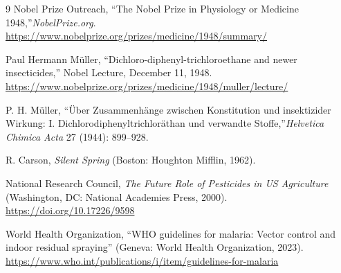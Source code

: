 \begin{thebibliography}{9}
Nobel Prize Outreach, ``The Nobel Prize in Physiology or Medicine 1948,''\emph{NobelPrize.org}.\\
\url{https://www.nobelprize.org/prizes/medicine/1948/summary/}

Paul Hermann M\"uller, ``Dichloro-diphenyl-trichloroethane and newer insecticides,'' Nobel Lecture, December 11, 1948.\\
\url{https://www.nobelprize.org/prizes/medicine/1948/muller/lecture/}

P. H. M\"uller, ``Über Zusammenhänge zwischen Konstitution und insektizider Wirkung: I. Dichlorodiphenyltrichloräthan und verwandte Stoffe,''\emph{Helvetica Chimica Acta} 27 (1944): 899--928.

R. Carson, \emph{Silent Spring} (Boston: Houghton Mifflin, 1962).

National Research Council, \emph{The Future Role of Pesticides in US Agriculture} (Washington, DC: National Academies Press, 2000).\\
\url{https://doi.org/10.17226/9598}

World Health Organization, ``WHO guidelines for malaria: Vector control and indoor residual spraying'' (Geneva: World Health Organization, 2023).\\
\url{https://www.who.int/publications/i/item/guidelines-for-malaria}
\end{thebibliography}
